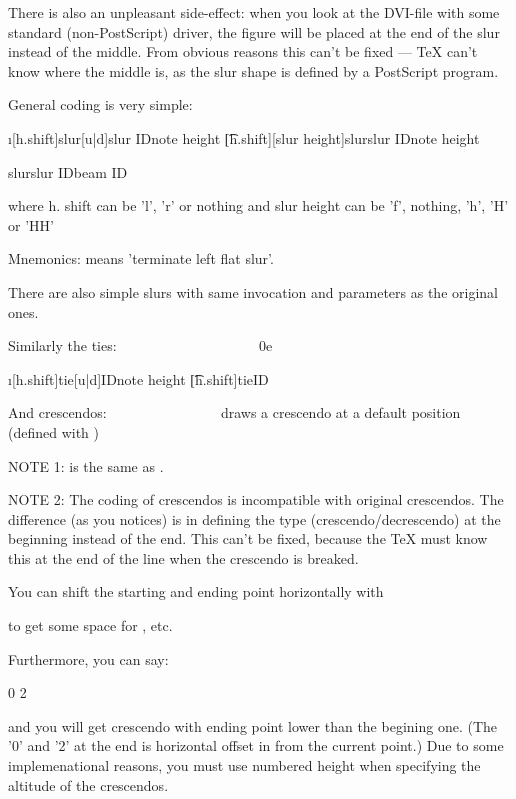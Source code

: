 There is also an unpleasant side-effect: when you look at the
DVI-file with some standard (non-PostScript) driver, the figure will
be placed at the end of the slur instead of the middle. From obvious
reasons this can't be fixed --- TeX can't know where the middle is,
as the slur shape is defined by a PostScript program.


General coding is very simple:

\i[h.shift]slur[u|d]{slur ID}{note height}
\t[h.shift][slur height]slur{slur ID}{note height}

slur{slur ID}{beam ID}

where h. shift can be 'l', 'r' or nothing
and slur height can be 'f', nothing, 'h', 'H' or 'HH'

Mnemonics: \tlfslur means 'terminate left flat slur'.


There are also simple slurs with same invocation and parameters as the
original ones.


Similarly the ties:
~~~~~~~~~~~~~~~~~~~
\itieu0e

\i[h.shift]tie[u|d]{ID}{note height}
\t[h.shift]tie{ID}


And crescendos:
~~~~~~~~~~~~~~~
   draws a crescendo at a default position (defined with
           \setcrescheight)

NOTE 1: \tcresc is the same as \tdecresc.

NOTE 2: The coding of crescendos is incompatible with original crescendos.
        The difference (as you notices) is in defining the type
        (crescendo/decrescendo) at the beginning instead of the end.
        This can't be fixed, because the TeX must know this at the end
        of the line when the crescendo is breaked.


You can shift the starting and ending point horizontally with

\ilcresc    \ildecresc
\ircresc    \irdecresc
\tlcresc    \tldecresc
\trcresc    \trdecresc

to get some space for \mf, \ff etc.


Furthermore, you can say:

0
2

and you will get crescendo with ending point lower than the begining
one. (The '0' and '2' at the end is horizontal offset in \internote
from the current point.) Due to some implemenational reasons, you must
use numbered height when specifying the altitude of the crescendos.




